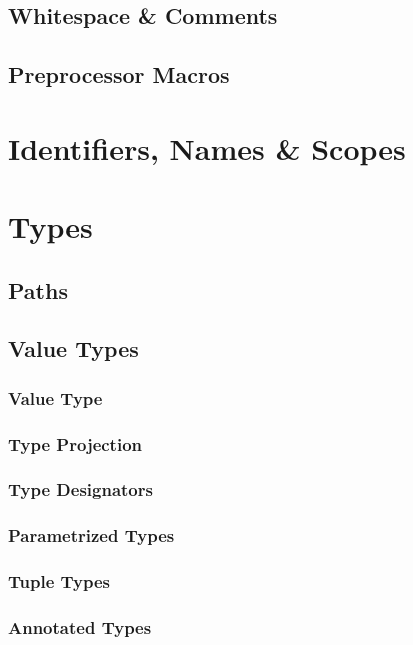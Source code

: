 \section{Whitespace \& Comments}\label{sec:whitespacecomments}

\section{Preprocessor Macros}\label{sec:preprocessormacros}

\chapter{Identifiers, Names \& Scopes}

\chapter{Types}

\section{Paths}

\section{Value Types}

\subsection{Value Type}

\subsection{Type Projection}

\subsection{Type Designators}

\subsection{Parametrized Types}

\subsection{Tuple Types}

\subsection{Annotated Types}

